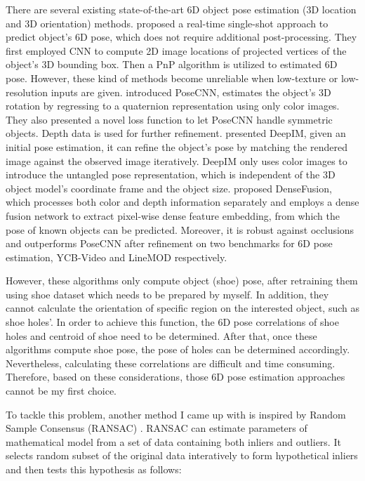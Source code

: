 There are several existing state-of-the-art 6D object pose estimation (3D location and 3D orientation) methods. \citep{singleshot} proposed a real-time single-shot approach to predict object's 6D pose, which does not require additional post-processing. They first employed CNN to compute 2D image locations of projected vertices of the object’s 3D bounding box. Then a PnP algorithm is utilized to estimated 6D pose. However, these kind of methods become unreliable when low-texture or low-resolution inputs are given. \citep{PoseCNN} introduced PoseCNN, estimates the object's 3D rotation by regressing to a quaternion representation using only color images. They also presented a novel loss function to let PoseCNN handle symmetric objects. Depth data is used for further refinement. \citep{DeepIM} presented DeepIM, given an initial pose estimation, it can refine the object's pose by matching the rendered image against the observed image iteratively. DeepIM only uses color images to introduce the untangled pose representation, which is independent of the 3D object model's coordinate frame and the object size. \citep{DenseFusion} proposed DenseFusion, which processes both color and depth information separately and employs a dense fusion network to extract pixel-wise dense feature embedding, from which the pose of known objects can be predicted. Moreover, it is robust against occlusions and outperforms PoseCNN after refinement on two benchmarks for 6D pose estimation, YCB-Video \citep{PoseCNN} and LineMOD \citep{linemod} respectively.

However, these algorithms only compute object (shoe) pose, after retraining them using shoe dataset which needs to be prepared by myself. In addition, they cannot calculate the orientation of specific region on the interested object, such as shoe holes'. In order to achieve this function, the 6D pose correlations of shoe holes and centroid of shoe need to be determined. After that, once these algorithms compute shoe pose, the pose of holes can be determined accordingly. Nevertheless, calculating these correlations are difficult and time consuming. Therefore, based on these considerations, those 6D pose estimation approaches cannot be my first choice.

To tackle this problem, another method I came up with is inspired by Random Sample Consensus (RANSAC) \citep{rsc}. RANSAC can estimate parameters of mathematical model from a set of data containing both inliers and outliers. It selects random subset of the original data interatively to form hypothetical inliers and then tests this hypothesis as follows:

